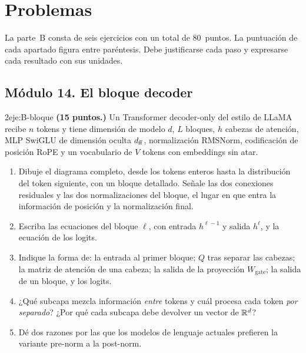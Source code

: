 \chapter{Problemas}
\label{chap:parteB}

La parte~B consta de seis ejercicios con un total de 80~puntos. La puntuación de cada apartado figura entre paréntesis. Debe justificarse cada paso y expresarse cada resultado con sus unidades.

\section*{Módulo 14. El bloque decoder}

\begin{ejercicio}{2}{eje:B-bloque}
\textbf{(15 puntos.)} Un Transformer decoder-only del estilo de LLaMA recibe $n$ tokens y tiene dimensión de modelo $d$, $L$ bloques, $h$ cabezas de atención, MLP SwiGLU de dimensión oculta $d_{\mathrm{ff}}$, normalización RMSNorm, codificación de posición RoPE y un vocabulario de $V$ tokens con embeddings sin atar.
\begin{enumerate}[label=(\alph*)]
  \item {} Dibuje el diagrama completo, desde los tokens enteros hasta la distribución del token siguiente, con un bloque detallado. Señale las dos conexiones residuales y las dos normalizaciones del bloque, el lugar en que entra la información de posición y la normalización final.
  \item {} Escriba las ecuaciones del bloque $\ell$, con entrada $h^{\ell-1}$ y salida $h^{\ell}$, y la ecuación de los logits.
  \item {} Indique la forma de: la entrada al primer bloque; $Q$ tras separar las cabezas; la matriz de atención de una cabeza; la salida de la proyección $W_{\mathrm{gate}}$; la salida de un bloque, y los logits.
  \item {} ¿Qué subcapa mezcla información \emph{entre} tokens y cuál procesa cada token \emph{por separado}? ¿Por qué cada subcapa debe devolver un vector de $\mathbb{R}^{d}$?
  \item {} Dé dos razones por las que los modelos de lenguaje actuales prefieren la variante pre-norm a la post-norm.
\end{enumerate}
\end{ejercicio}

